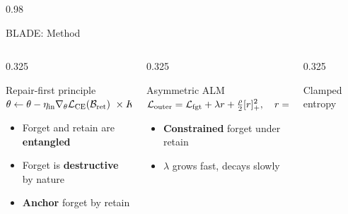 \documentclass[final,svgnames,english]{beamer}
\begin{document}
\begin{frame}[t,fragile]{}
\begin{columns}[T]
\begin{column}{0.98\linewidth}
\begin{psublock}{BLADE: Method}
        \begin{columns}[T]
          \begin{column}{0.325\linewidth}
            \begin{compblock}{Repair-first principle}
              \centering
              \\[0.4ex]
              $\displaystyle \theta \leftarrow \theta - \eta_{\text{in}}\nabla_\theta\mathcal{L}_{\text{CE}}(\mathcal{B}_{\text{ret}})
                \ \times K$\par\vspace{0.4ex}
              \raggedright
              \begin{itemize}
                \item Forget and retain are \textbf{entangled}
                \item Forget is \textbf{destructive} by nature
                \item \textbf{Anchor} forget by retain
              \end{itemize}
            \end{compblock}
          \end{column}
          \begin{column}{0.325\linewidth}
            \begin{compblock}{Asymmetric ALM}
              \centering
              \\[0.4ex]
              $\displaystyle \mathcal{L}_{\text{outer}} = \mathcal{L}_{\text{fgt}} + \lambda r + \tfrac{\rho}{2}[r]_+^2,
                \quad r = \mathcal{L}_{\text{ret}} - \varepsilon$\par\vspace{0.4ex}
              \raggedright
              \begin{itemize}
                \item \textbf{Constrained} forget under retain
                \item $\lambda$ grows fast, decays slowly
              \end{itemize}
            \end{compblock}
          \end{column}
          \begin{column}{0.325\linewidth}
            \begin{compblock}{Clamped entropy}
              \centering
              \\[0.4ex]

\end{compblock}
\end{column}
\end{columns}
\end{psublock}
\end{column}
\end{columns}
\end{frame}
\end{document}
